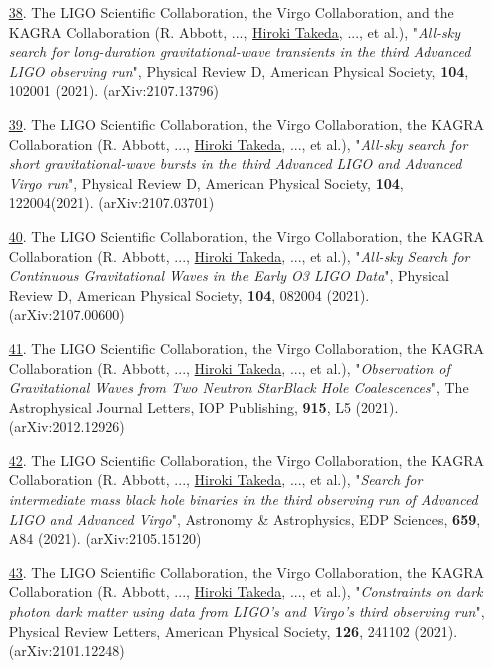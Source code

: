 \documentclass[uplatex, 12pt]{article}
\begin{document}
\begin{enumerate}
\item[\uline{38}.] The LIGO Scientific Collaboration, the Virgo Collaboration, and the KAGRA Collaboration (R. Abbott, ..., \uline{Hiroki Takeda}, ..., et al.), "\emph{All-sky search for long-duration gravitational-wave transients in the third Advanced LIGO observing run}", Physical Review D, American Physical Society, {\bf 104}, 102001 (2021). (arXiv:2107.13796)\\

\item[\uline{39}.] The LIGO Scientific Collaboration, the Virgo Collaboration, the KAGRA Collaboration (R. Abbott, ..., \uline{Hiroki Takeda}, ..., et al.), "\emph{All-sky search for short gravitational-wave bursts in the third Advanced LIGO and Advanced Virgo run}", Physical Review D, American Physical Society, {\bf 104}, 122004(2021). (arXiv:2107.03701)\\

\item[\uline{40}.] The LIGO Scientific Collaboration, the Virgo Collaboration, the KAGRA Collaboration (R. Abbott, ..., \uline{Hiroki Takeda}, ..., et al.), "\emph{All-sky Search for Continuous Gravitational Waves in the Early O3 LIGO Data}", Physical Review D, American Physical Society, {\bf 104}, 082004 (2021). (arXiv:2107.00600)\\

\item[\uline{41}.] The LIGO Scientific Collaboration, the Virgo Collaboration, the KAGRA Collaboration (R. Abbott, ..., \uline{Hiroki Takeda}, ..., et al.), "\emph{Observation of Gravitational Waves from Two Neutron StarBlack Hole Coalescences}", The Astrophysical Journal Letters, IOP Publishing, {\bf 915}, L5 (2021). (arXiv:2012.12926)\\

\item[\uline{42}.] The LIGO Scientific Collaboration, the Virgo Collaboration, the KAGRA Collaboration (R. Abbott, ..., \uline{Hiroki Takeda}, ..., et al.), "\emph{Search for intermediate mass black hole binaries in the third observing run of Advanced LIGO and Advanced Virgo}", Astronomy \& Astrophysics, EDP Sciences, {\bf 659}, A84 (2021). (arXiv:2105.15120)\\

\item[\uline{43}.] The LIGO Scientific Collaboration, the Virgo Collaboration, the KAGRA Collaboration (R. Abbott, ..., \uline{Hiroki Takeda}, ..., et al.), "\emph{Constraints on dark photon dark matter using data from LIGO's and Virgo's third observing run}", Physical Review Letters, American Physical Society, {\bf 126}, 241102 (2021). (arXiv:2101.12248)\\


\end{enumerate}
\end{document}
